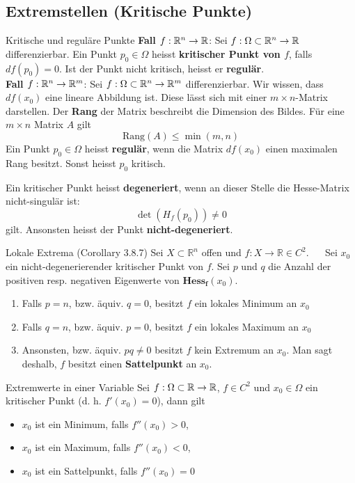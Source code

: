 \subsection{Extremstellen (Kritische Punkte)}

\begin{Definition}[label=R1]{Kritische und reguläre Punkte}{}
	\textbf{Fall $f: \mathbb{R}^n \to \mathbb{R}$}: Sei 	$f: \Omega \subset \mathbb{R}^n \to \mathbb{R}$ differenzierbar. Ein Punkt $p_0 \in \Omega$ heisst \textbf{kritischer Punkt von $f$}, falls $df(p_0)=0$. Ist der Punkt nicht kritisch, heisst er \textbf{regulär}.\\
	
	\textbf{Fall $f: \mathbb{R}^n \to \mathbb{R}^m$}: Sei $f: \Omega \subset \mathbb{R}^n \to \mathbb{R}^m$ differenzierbar. Wir wissen, dass $df(x_0)$ eine lineare Abbildung ist. Diese lässt sich mit einer $m\times n$-Matrix darstellen. Der \textbf{Rang} der Matrix beschreibt die Dimension des Bildes. Für eine $m \times n$ Matrix $A$ gilt \[\text{Rang}(A) \leq \min(m, n)\] Ein Punkt $p_0 \in \Omega$ heisst \textbf{regulär}, wenn die Matrix $df(x_0)$ einen maximalen Rang besitzt. Sonst heisst $p_0$ kritisch.
	
	Ein kritischer Punkt heisst \textbf{degeneriert}, wenn an dieser Stelle die Hesse-Matrix nicht-singulär ist: \[\det(H_f(p_0)) \neq 0\] gilt. Ansonsten heisst der Punkt \textbf{nicht-degeneriert}.
\end{Definition}

\begin{Satz}{Lokale Extrema (Corollary 3.8.7)}{}
Sei $X\subset \mathbb{R}^n$ offen und $f: X \rightarrow \mathbb{R} \in C^2$. ~~
Sei $x_0$ ein nicht-degenerierender kritischer Punkt von $f$. Sei $p$ und $q$
die Anzahl der positiven resp. negativen Eigenwerte von $\mathbf{Hess_f}(x_0)$.

\begin{enumerate}
\item Falls $p=n$, bzw. äquiv. $q=0$, besitzt $f$ ein lokales Minimum an $x_0$
\item Falls $q=n$, bzw. äquiv. $p=0$, besitzt $f$ ein lokales Maximum an $x_0$
\item Ansonsten, bzw. äquiv. $pq\neq 0$ besitzt $f$ kein Extremum an $x_0$. Man sagt
deshalb, $f$ besitzt einen \textbf{Sattelpunkt} an $x_0$.
\end{enumerate}
\end{Satz}

\begin{Satz}{Extremwerte in einer Variable}{}
	Sei $f: \Omega \subset \mathbb{R} \to \mathbb{R}$, $f \in C^2$ und $x_0 \in \Omega$ ein kritischer Punkt (d. h. $f'(x_0) = 0$), dann gilt
	\begin{itemize}
		\item $x_0$ ist ein Minimum, falls $f''(x_0) > 0$,
		\item $x_0$ ist ein Maximum, falls $f''(x_0) < 0$,
		\item $x_0$ ist ein Sattelpunkt, falls $f''(x_0) = 0$
	\end{itemize}
\end{Satz}

